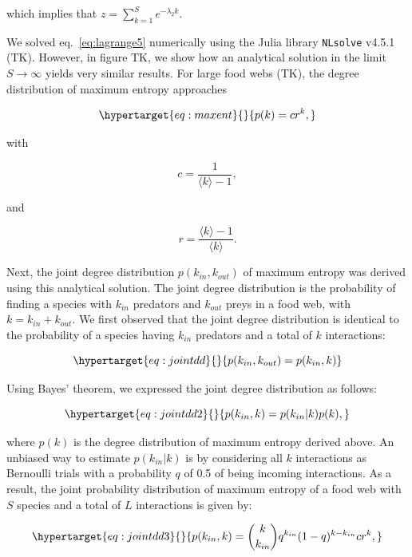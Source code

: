 \documentclass[11pt]{article}
\begin{document}
which implies that \(z = \sum_{k=1}^{S}e^{-\lambda_2k}\).

We solved eq.~\ref{eq:lagrange5} numerically using the Julia library
\texttt{NLsolve} v4.5.1 (TK). However, in figure TK, we show how an
analytical solution in the limit \(S \rightarrow \infty\) yields very
similar results. For large food webs (TK), the degree distribution of
maximum entropy approaches

\begin{equation}\protect\hypertarget{eq:maxent}{}{p(k) = c r^{k},}\label{eq:maxent}\end{equation}

with

\[c = \frac{{1}}{\langle k \rangle-1},\]

and

\[r = \frac{{\langle k \rangle-1}}{\langle k \rangle}.\]

Next, the joint degree distribution \(p(k_{in},k_{out})\) of maximum
entropy was derived using this analytical solution. The joint degree
distribution is the probability of finding a species with \(k_{in}\)
predators and \(k_{out}\) preys in a food web, with
\(k = k_{in} + k_{out}\). We first observed that the joint degree
distribution is identical to the probability of a species having
\(k_{in}\) predators and a total of \(k\) interactions:

\begin{equation}\protect\hypertarget{eq:jointdd}{}{p(k_{in},k_{out}) = p(k_{in},k)}\label{eq:jointdd}\end{equation}

Using Bayes' theorem, we expressed the joint degree distribution as
follows:

\begin{equation}\protect\hypertarget{eq:jointdd2}{}{p(k_{in},k) = p(k_{in}|k)p(k),}\label{eq:jointdd2}\end{equation}

where \(p(k)\) is the degree distribution of maximum entropy derived
above. An unbiased way to estimate \(p(k_{in}|k)\) is by considering all
\(k\) interactions as Bernoulli trials with a probability \(q\) of 0.5
of being incoming interactions. As a result, the joint probability
distribution of maximum entropy of a food web with \(S\) species and a
total of \(L\) interactions is given by:

\begin{equation}\protect\hypertarget{eq:jointdd3}{}{p(k_{in},k) = {k\choose k_{in}}q^{k_{in}}(1-q)^{k-k_{in}}c r^{k},}\label{eq:jointdd3}\end{equation}
\end{document}
